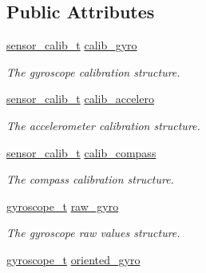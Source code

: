 \subsection*{Public Attributes}
\begin{DoxyCompactItemize}
\item 
\hypertarget{structimu__t_a47465974a81e5e10d425611b6eb7a445}{\hyperlink{structsensor__calib__t}{sensor\+\_\+calib\+\_\+t} \hyperlink{structimu__t_a47465974a81e5e10d425611b6eb7a445}{calib\+\_\+gyro}}\label{structimu__t_a47465974a81e5e10d425611b6eb7a445}

\begin{DoxyCompactList}\small\item\em The gyroscope calibration structure. \end{DoxyCompactList}\item 
\hypertarget{structimu__t_afe3fa78d453e01f92bc2dac53feec870}{\hyperlink{structsensor__calib__t}{sensor\+\_\+calib\+\_\+t} \hyperlink{structimu__t_afe3fa78d453e01f92bc2dac53feec870}{calib\+\_\+accelero}}\label{structimu__t_afe3fa78d453e01f92bc2dac53feec870}

\begin{DoxyCompactList}\small\item\em The accelerometer calibration structure. \end{DoxyCompactList}\item 
\hypertarget{structimu__t_a544358b5eddea81cc45313ef88e9e9e9}{\hyperlink{structsensor__calib__t}{sensor\+\_\+calib\+\_\+t} \hyperlink{structimu__t_a544358b5eddea81cc45313ef88e9e9e9}{calib\+\_\+compass}}\label{structimu__t_a544358b5eddea81cc45313ef88e9e9e9}

\begin{DoxyCompactList}\small\item\em The compass calibration structure. \end{DoxyCompactList}\item 
\hypertarget{structimu__t_aaafbffb485ce5683ee6a66445fbe9ea8}{\hyperlink{structgyroscope__t}{gyroscope\+\_\+t} \hyperlink{structimu__t_aaafbffb485ce5683ee6a66445fbe9ea8}{raw\+\_\+gyro}}\label{structimu__t_aaafbffb485ce5683ee6a66445fbe9ea8}

\begin{DoxyCompactList}\small\item\em The gyroscope raw values structure. \end{DoxyCompactList}\item 
\hypertarget{structimu__t_a41b25013a077e227bf06f39a4fb713ce}{\hyperlink{structgyroscope__t}{gyroscope\+\_\+t} \hyperlink{structimu__t_a41b25013a077e227bf06f39a4fb713ce}{oriented\+\_\+gyro}}\label{structimu__t_a41b25013a077e227bf06f39a4fb713ce}


\end{DoxyCompactItemize}

